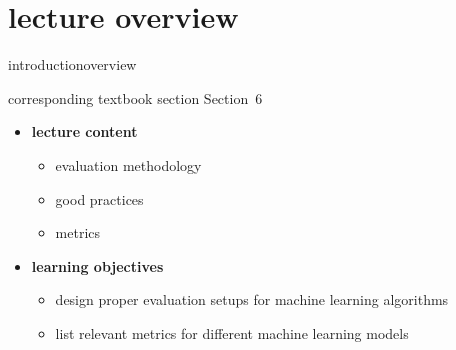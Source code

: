 


\subtitle{Module 6.0: Evaluation and Metrics}


	

    \section[overview]{lecture overview}
        \begin{frame}{introduction}{overview}
            \begin{block}{corresponding textbook section}
                    Section~6
            \end{block}

            \begin{itemize}
                \item   \textbf{lecture content}
                    \begin{itemize}
                        \item   evaluation methodology
                        \item   good practices
                        \item   metrics
                    \end{itemize}
                \bigskip
                \item<2->   \textbf{learning objectives}
                    \begin{itemize}
                        \item   design proper evaluation setups for machine learning algorithms
                        \item   list relevant metrics for different machine learning models
                    \end{itemize}
            \end{itemize}
        \end{frame}

